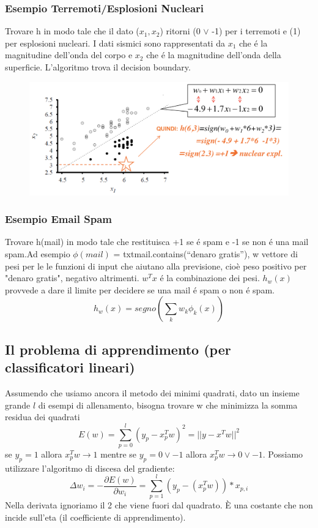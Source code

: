\documentclass{article}
\begin{document}
\subsubsection{Esempio Terremoti/Esplosioni Nucleari}
Trovare h in modo tale che il dato ($x_1, x_2$) ritorni (0 $\lor$ -1) per i terremoti e (1) per esplosioni nucleari. I dati sismici sono rappresentati da $x_1$ che é la magnitudine dell'onda del corpo e $x_2$ che é la magnitudine dell'onda della superficie. L'algoritmo trova il decision boundary.
\begin{figure}[H]
\centering
\includegraphics[scale=0.4]{Images/magnitudegraph.png}
\end{figure}

\subsubsection{Esempio Email Spam}
Trovare h(mail) in modo tale che restituisca +1 se é spam e -1 se non é una mail spam.\newline  Ad esempio $\phi(mail)$ = txtmail.contains(“denaro gratis”), w vettore di pesi per le le funzioni di input che aiutano alla previsione, cioè peso positivo per "denaro gratis", negativo altrimenti. $w^Tx$ é la combinazione dei pesi. $h_w(x)$ provvede a dare il limite per decidere se una mail é spam o non é spam.
\begin{equation}
    h_w(x)= segno(\sum_{k} w_k\phi_k(x))
\end{equation}

\subsection{Il problema di apprendimento (per classificatori lineari)}
Assumendo che usiamo ancora il metodo dei minimi quadrati, dato un insieme grande $l$ di esempi di allenamento, bisogna trovare w che minimizza la somma residua dei quadrati
\begin{equation}
    E(w)=\sum_{p = 0}^l(y_p-x_p^Tw)^2=||y-x^Tw||^2
\end{equation}
se $y_p=1$ allora $x_p^Tw \rightarrow 1$ mentre se $y_p=0\lor -1$ allora $x_p^Tw \rightarrow 0 \lor -1$. \newline 
Possiamo utilizzare l'algoritmo di discesa del gradiente:
\begin{equation}
    \Delta w_i = - \frac{\partial E(w)}{\partial w_i} = \sum_{p=1}^l (y_p - (x_p^Tw)) * x_{p,i}
\end{equation}
Nella derivata ignoriamo il 2 che viene fuori dal quadrato. È una costante che non incide sull'eta (il coefficiente di apprendimento).
\end{document}
